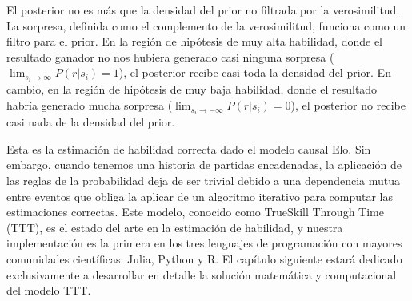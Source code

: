 \documentclass[a4paper,10pt]{book}
\theoremstyle{definition}
\newif\ifen
\newif\ifes
\newcommand{\en}[1]{\ifen#1\fi}
\newcommand{\es}[1]{\ifes#1\fi}
\begin{document}
%
\begin{figure}[ht!]
    \centering
    \en{\texttt{[image: figures/posterior\_win]}}
    \es{\texttt{[image: figures/posterior\_win]}}
    \caption{
    \en{Belief update for the winning case. }%
    \es{Actualizaci\'on de creencias para el caso ganador. }%
    \en{The proportional posterior is obtained as the product of the prior (Gaussian) and the likelihood (cumulative Gaussian). }%
    \es{El posterior proporcional se obtiene como el producto de la distribuci\'on a priori (distribuci\'on gaussiana) y la verosimilitud (distribuci\'on gaussiana acumulada). }%
    \en{The evidence is the integral of the proportional posterior. }%
    \es{La evidencia es la integral del posterior proporcional. }%
    \en{The distributions are not necessarily on the same scale: the prior integrates to $1$, while the likelihood goes from $0$ to $1$. }%
    \es{Las distribuciones no est\'an necesariamente en la misma escala: la distribuci\'on a priori integra 1, mientras que la verosimilitud va de 0 a 1. }%
    }
    \label{fig:posterior_win}
\end{figure}

El posterior no es m\'as que la densidad del prior no filtrada por la verosimilitud.
%
La sorpresa, definida como el complemento de la verosimilitud, funciona como un filtro para el prior.
%    
En la regi\'on de hip\'otesis de muy alta habilidad, donde el resultado ganador no nos hubiera generado casi ninguna sorpresa ($\lim_{s_i \to \infty}P(r|s_i) = 1$), el posterior recibe casi toda la densidad del prior.
%
En cambio, en la regi\'on de hip\'otesis de muy baja habilidad, donde el resultado habr\'ia generado mucha sorpresa ($\lim_{s_i \to -\infty}P(r|s_i) = 0$), el posterior no recibe casi nada de la densidad del prior.


Esta es la estimación de habilidad correcta dado el modelo causal Elo.
%
Sin embargo, cuando tenemos una historia de partidas encadenadas, la aplicación de las reglas de la probabilidad deja de ser trivial debido a una dependencia mutua entre eventos que obliga la aplicar de un algoritmo iterativo para computar las estimaciones correctas.
%
Este modelo, conocido como TrueSkill Through Time (TTT), es el estado del arte en la estimación de habilidad, y nuestra implementación es la primera en los tres lenguajes de programación con mayores comunidades científicas: Julia, Python y R.
%
El capítulo siguiente estará dedicado exclusivamente a desarrollar en detalle la solución matemática y computacional del modelo TTT.
\end{document}
